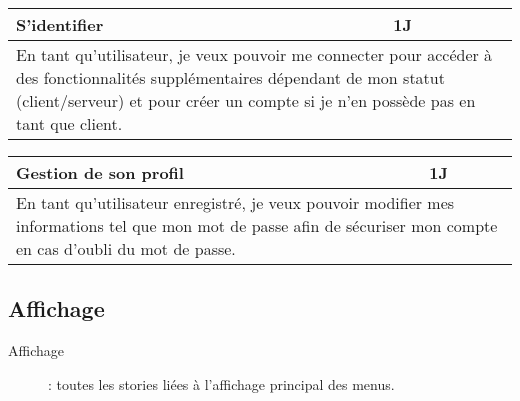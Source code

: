 \begin{center}
	\begin{tabular}{ll}
		\hline
			\multicolumn{1}{|p{14cm}|}{S'identifier} & \multicolumn{1}{p{0.7cm}|}{1J} \\ 
		\hline
			\multicolumn{2}{|p{15cm}|}{En tant qu'utilisateur, je veux pouvoir
			me connecter pour accéder à des fonctionnalités supplémentaires 
			dépendant de mon statut (client/serveur) et pour créer un compte si 
			je n'en possède pas en tant que client.} \\
		\hline
	\end{tabular}

	\vspace{1cm}
	
	\begin{tabular}{ll}
		\hline
			\multicolumn{1}{|p{14cm}|}{Gestion de son profil } & \multicolumn{1}{p{0.7cm}|}{1J} \\ 
		\hline
			\multicolumn{2}{|p{15cm}|}{En tant qu'utilisateur enregistré, je veux pouvoir
			modifier mes informations tel que mon mot de passe afin de sécuriser mon compte
			en cas d'oubli du mot de passe.} \\
		\hline
	\end{tabular}
\end{center}

\subsection{Affichage}
\begin{description}
	\item[Affichage] : toutes les stories liées à l'affichage principal des menus.
\end{description}

